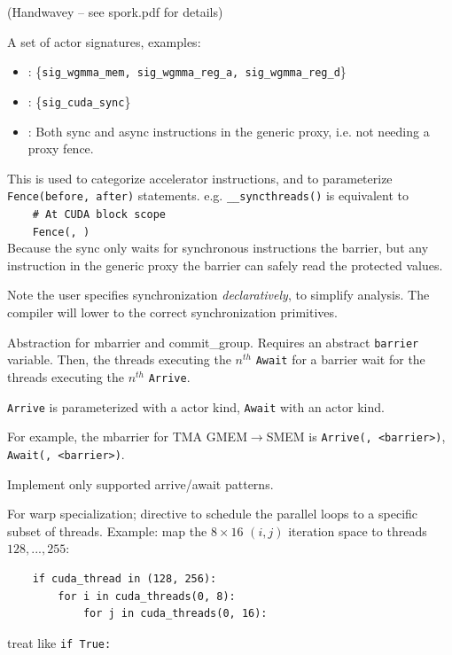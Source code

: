 \newpage
{}

\begin{minipage}[t]{0.5\textwidth}\fixminipage
(Handwavey -- see spork.pdf for details)


A set of actor signatures, examples:
\begin{itemize}
  \item {}: \{\texttt{sig\_wgmma\_mem, sig\_wgmma\_reg\_a, sig\_wgmma\_reg\_d}\}
  \item {}: \{\texttt{sig\_cuda\_sync}\}
  \item {}: Both sync and async instructions in the generic proxy, i.e. not needing a proxy fence.
\end{itemize}
This is used to categorize accelerator instructions,
and to parameterize \texttt{Fence(before, after)} statements.
e.g. \texttt{\_\_syncthreads()} is equivalent to\\
\texttt{\ \ \ \ \# At CUDA block scope} \\
\texttt{\ \ \ \ Fence(, )} \\
Because the sync only waits for synchronous instructions  the barrier, but any instruction in the generic proxy  the barrier can safely read the protected values.

Note the user specifies synchronization \textit{declaratively}, to simplify analysis.
The compiler will lower to the correct synchronization primitives.
\end{minipage}
\hfill
\begin{minipage}[t]{0.5\textwidth}\fixminipage
{}

Abstraction for mbarrier and commit\_group.
Requires an abstract \texttt{barrier} variable.
Then, the threads executing the $n^{th}$ \texttt{Await} for a barrier wait for the threads executing the $n^{th}$ \texttt{Arrive}.

\texttt{Arrive} is parameterized with a  actor kind, \texttt{Await} with an  actor kind.

For example, the mbarrier for TMA GMEM$\to$SMEM is \texttt{Arrive(, <barrier>)},\\\texttt{Await(, <barrier>)}.

Implement only supported arrive/await patterns.


For warp specialization; directive to schedule the parallel loops to a specific subset of threads.
Example: map the $8 \times 16$ $(i,j)$ iteration space to threads $128,...,255$:
\begin{verbatim}
    if cuda_thread in (128, 256):
        for i in cuda_threads(0, 8):
            for j in cuda_threads(0, 16):
\end{verbatim}
 treat like \texttt{if True:}
\end{minipage}

